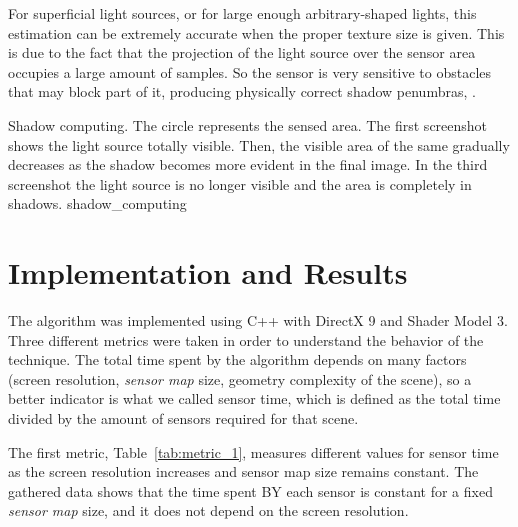 \documentclass[10pt, conference]{IEEEtran}
\begin{document}
For superficial light sources, or for large enough arbitrary-shaped lights, this estimation can be extremely accurate when the proper texture size is given. 
This is due to the fact that the projection of the light source over the sensor area occupies a large amount of samples. 
So the sensor is very sensitive to obstacles that may block part of it, producing physically correct shadow penumbras, .

\subimages
	{Shadow computing. The circle represents the sensed area.
	The first screenshot shows the light source totally visible. 
	Then, the visible area of the same gradually decreases as the shadow becomes more evident in the final image. 
	In the third screenshot the light source is no longer visible and the area is completely in shadows.}
	{shadow_computing}{
}


\section{Implementation and Results}
%
The algorithm was implemented using C++ with DirectX 9 and Shader Model 3. 
Three different metrics were taken in order to understand the behavior of the technique.
The total time spent by the algorithm depends on many factors (screen resolution, \emph{sensor map} size, geometry complexity of the scene), so a better indicator is what we called sensor time, which is defined as the total time divided by the amount of sensors required for that scene.\

The first metric, Table~\ref{tab:metric_1}, measures different values for sensor time as the screen resolution increases and sensor map size remains constant.
The gathered data shows that the time spent BY each sensor is constant for a fixed \emph{sensor map} size, and it does not depend on the screen resolution.\
\end{document}
